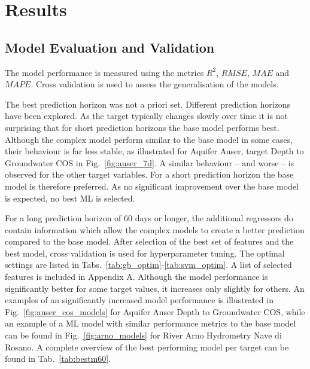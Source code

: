 \documentclass{article}
\begin{document}
\FloatBarrier


\section{Results}

\subsection*{Model Evaluation and Validation}

The model performance is measured using the metrics $R^2$, $RMSE$, $MAE$ and $MAPE$. Cross validation is used to assess the generalisation of the models. 

The best prediction horizon was not a priori set. Different prediction horizons have been explored. As the target typically changes slowly over time it is not surprising that for short prediction horizons the base model performs best. Although the complex model perform similar to the base model in some cases, their behaviour is far less stable, as illustrated for Aquifer Auser, target Depth to Groundwater COS in Fig.~\ref{fig:auser_7d}. A similar behaviour -- and worse -- is observed for the other target variables. For a short prediction horizon the base model is therefore preferred. As no significant improvement over the base model is expected, no best ML is selected.

For a long prediction horizon of 60 days or longer, the additional regressors do contain information which allow the complex models to create a better prediction compared to the base model. After selection of the best set of features and the best model, cross validation is used for hyperparameter tuning. The optimal settings are listed in Tabs.~\ref{tab:gb_optim}-\ref{tab:svm_optim}. A list of selected features is included in Appendix A. Although the model performance is significantly better for some target values, it increases only slightly for others. An examples of an significantly increased model performance is illustrated in Fig.~\ref{fig:auser_cos_models} for Aquifer Auser Depth to Groundwater COS, while an example of a ML model with similar performance metrics to the base model can be found in Fig.~\ref{fig:arno_models} for River Arno Hydrometry Nave di Rosano. A complete overview of the best performing model per target can be found in Tab.~\ref{tab:bestm60}.
\end{document}
